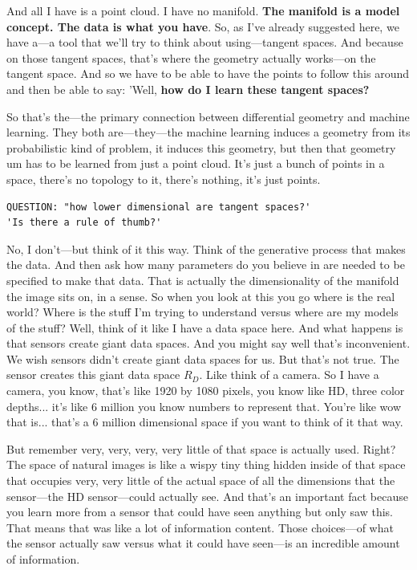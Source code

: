 And all I have is a point cloud. I have no manifold. \textbf{The manifold is a model concept. The data is what you have}. So, as I've already suggested here, we have a—a tool that we'll try to think about using—tangent spaces. And because on those tangent spaces, that's where the geometry actually works—on the tangent space. And so we have to be able to have the points to follow this around and then be able to say: 'Well, \textbf{how do I learn these tangent spaces?}

So that's the—the primary connection between differential geometry and machine learning. They both are—they—the machine learning induces a geometry from its probabilistic kind of problem, it induces this geometry, but then that geometry um has to be learned from just a point cloud. It's just a bunch of points in a space, there's no topology to it, there's nothing, it's just points. 


\begin{verbatim}
QUESTION: "how lower dimensional are tangent spaces?' 
'Is there a rule of thumb?' 
\end{verbatim}

No, I don't—but think of it this way. Think of the generative process that makes the data. And then ask how many parameters do you believe in are needed to be specified to make that data.  That is actually the dimensionality of the manifold the image sits on, in a sense.
So when you look at this you go where is the real world? Where is the stuff I'm trying to understand versus where are my models of the stuff? Well, think of it like I have a data space here. And what happens is that sensors create giant data spaces. And you might say well that's inconvenient. We wish sensors didn't create giant data spaces for us. But that's not true. The sensor creates this giant data space $R_D$. Like think of a camera. So I have a camera, you know, that's like 1920 by 1080 pixels, you know like HD, three color depths... it's like 6 million you know numbers to represent that. You're like wow that is... that's a 6 million dimensional space if you want to think of it that way. 

But remember very, very, very, very little of that space is actually used. Right? The space of natural images is like a wispy tiny thing hidden inside of that space that occupies very, very little of the actual space of all the dimensions that the sensor—the HD sensor—could actually see. And that's an important fact because you learn more from a sensor that could have seen anything but only saw this. That means that was like a lot of information content. Those choices—of what the sensor actually saw versus what it could have seen—is an incredible amount of information. 

